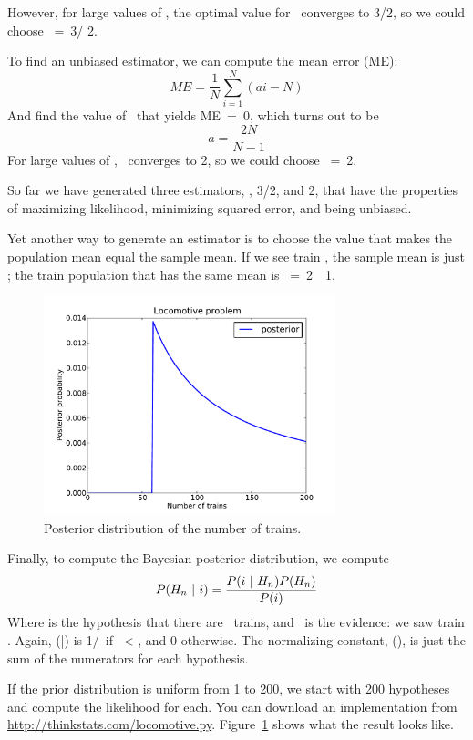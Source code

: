 \documentclass[12pt]{book}
\begin{document}
However, for large values of \N, the optimal value for \mya~converges
to 3/2, so we could choose \mynhat~=~3\ii / 2.

To find an unbiased estimator, we can compute the mean error (ME):
%
\[ ME = \frac{1}{N} \sum_{i=1}^N (ai - N) \]
%
And find the value of \mya~that yields ME~=~0, which turns out to be
%
\[ a = \frac{2N}{N-1}\]
%
For large values of \N, \mya~converges to 2, so we could choose
\mynhat~=~2\ii.

So far we have generated three estimators, \ii, 3\ii/2, and 2\ii,
that have the properties of maximizing likelihood, minimizing squared
error, and being unbiased.

Yet another way to generate an estimator is to choose the value
that makes the population mean equal the sample mean.  If we see train
\ii, the sample mean is just \ii; the train population that has the
same mean is \mynhat~=~2\ii~\minus~1.

\begin{figure}
\centerline{\includegraphics[height=2.5in]{figs/locomotive.pdf}}
\caption{Posterior distribution of the number of trains.}
\label{locomotive}
\end{figure}

Finally, to compute the Bayesian posterior distribution, we compute
%
\[ P(H_n ~|~ i) = \frac{P(i ~|~ H_n) P(H_n)}{P(i)} \]
%
Where \HH{} is the hypothesis that there are \n~trains, and \ii~is
the evidence: we saw train \ii.  Again, \Prob(\ii|\HH{})
is 1/\n~if \ii~< \n, and 0 otherwise.  The normalizing constant,
\Prob(\ii), is just the sum of the numerators for each hypothesis.

If the prior distribution is uniform from 1 to 200, we start with 200
hypotheses and compute the likelihood for each.  You can download an
implementation from
\url{http://thinkstats.com/locomotive.py}.  Figure~\ref{locomotive} shows
what the result looks like.
\end{document}
